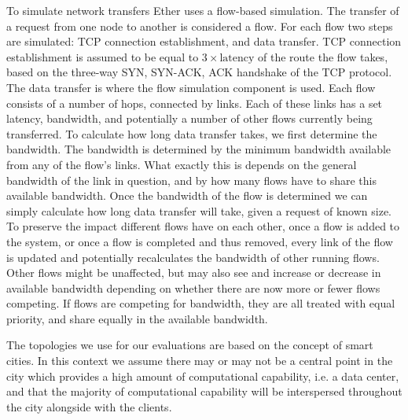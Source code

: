 To simulate network transfers Ether uses a flow-based simulation.
The transfer of a request from one node to another is considered a flow.
For each flow two steps are simulated: TCP connection establishment, and data transfer.
TCP connection establishment is assumed to be equal to $ 3 \times \text{latency}$ of the route the flow takes, based on the three-way SYN, SYN-ACK, ACK handshake of the TCP protocol.\\
The data transfer is where the flow simulation component is used.
Each flow consists of a number of hops, connected by links.
Each of these links has a set latency, bandwidth, and potentially a number of other flows currently being transferred.
To calculate how long data transfer takes, we first determine the bandwidth.
The bandwidth is determined by the minimum bandwidth available from any of the flow's links.
What exactly this is depends on the general bandwidth of the link in question, and by how many flows have to share this available bandwidth.
Once the bandwidth of the flow is determined we can simply calculate how long data transfer will take, given a request of known size.
To preserve the impact different flows have on each other, once a flow is added to the system, or once a flow is completed and thus removed, every link of the flow is updated and potentially recalculates the bandwidth of other running flows.
Other flows might be unaffected, but may also see and increase or decrease in available bandwidth depending on whether there are now more or fewer flows competing.
If flows are competing for bandwidth, they are all treated with equal priority, and share equally in the available bandwidth.


The topologies we use for our evaluations are based on the concept of smart cities\cite{suSmartCityApplications2011}.
In this context we assume there may or may not be a central point in the city which provides a high amount of computational capability, i.e. a data center, and that the majority of computational capability will be interspersed throughout the city alongside with the clients.

